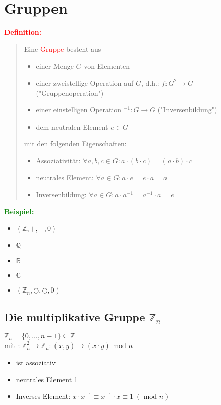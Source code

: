 \documentclass{article}
\newcommand{\red}[1]{\textcolor{red}{#1}}
\newcommand{\green}[1]{\textcolor{green}{#1}}
\newcommand{\ex}{\green{\textbf{Beispiel: }}}
\newcommand{\de}[1]{\red{\textbf{Definition: }}\begin{quote}#1\end{quote}}
\newcommand{\Z}{\mathbb{Z}}
\newcommand{\Q}{\mathbb{Q}}
\newcommand{\R}{\mathbb{R}}
\newcommand{\C}{\mathbb{C}}
\renewcommand{\mod}{\text{ mod }}
\begin{document}
\newpage
\section{Gruppen}

\de{
    Eine \red{Gruppe} besteht aus
    \begin{itemize}
        \item einer Menge $G$ von Elementen
        \item einer zweistellige Operation auf $G$, d.h.: $f: G^2 \to G$ ("Gruppenoperation")
        \item einer einstelligen Operation $^{-1}: G \to G$ ("Inversenbildung")
        \item dem neutralen Element $e \in G$
    \end{itemize}
    mit den folgenden Eigenschaften:
    \begin{itemize}
        \item Assoziativität: $\forall a,b,c \in G: a \cdot (b \cdot c) = (a \cdot b) \cdot c$
        \item neutrales Element: $\forall a \in G: a \cdot e = e \cdot a = a$
        \item Inversenbildung: $\forall a \in G: a \cdot a^{-1} = a^{-1} \cdot a = e$
    \end{itemize}
}
\ex \begin{itemize}
    \item $(\Z,+,-,0)$
    \item $\Q$
    \item $\R$
    \item $\C$
    \item $(\Z_n, \oplus, \ominus, 0)$
\end{itemize}

\subsection{\texorpdfstring{Die multiplikative Gruppe $\Z_n$}{Die multiplikative Gruppe Z}}

$\Z_n = \{0, \dots, n - 1\} \subseteq \Z$\\
mit $\cdot: \Z_n^2 \to \Z_n: (x,y) \mapsto (x \cdot y) \mod n$
\begin{itemize}
    \item ist assoziativ \checkmark
    \item neutrales Element 1
    \item Inverses Element: $x \cdot x^{-1} \equiv x^{-1} \cdot x \equiv 1 \; (\mod n)$
\end{itemize}
\end{document}
